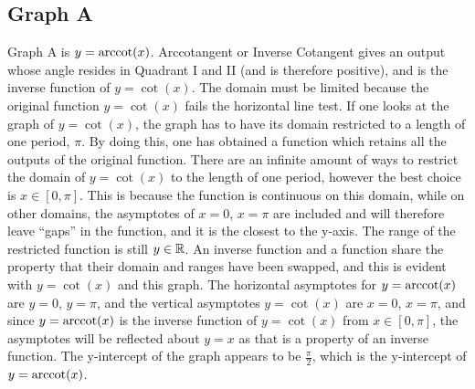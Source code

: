 \subsection{Graph A}

Graph A is $y=\operatorname{arccot}(x)$.
Arccotangent or Inverse Cotangent gives an output whose angle resides in Quadrant I and II (and is therefore positive), and is the inverse function of $y=\cot(x)$.
The domain must be limited because the original function $y=\cot(x)$ fails the horizontal line test.
If one looks at the graph of $y=\cot(x)$, the graph has to have its domain restricted to a length of one period, $\pi$.
By doing this, one has obtained a function which retains all the outputs of the original function.
There are an infinite amount of ways to restrict the domain of $y=\cot(x)$ to the length of one period, however the best choice is $x \in {[0,\pi]}$.
This is because the function is continuous on this domain, while on other domains, the asymptotes of $x=0$, $x=\pi$ are included and will therefore leave “gaps” in the function, and it is the closest to the y-axis.
The range of the restricted function is still $y \in \mathbb{R}$.
An inverse function and a function share the property that their domain and ranges have been swapped, and this is evident with $y=\cot(x)$ and this graph.
The horizontal asymptotes for $y=\operatorname{arccot}(x)$ are $y=0$, $y=\pi$, and the vertical asymptotes $y=\cot(x)$ are $x=0$, $x=\pi$, and since $y=\operatorname{arccot}(x)$ is the inverse function of $y=\cot(x)$ from $x \in {[0,\pi]}$, the asymptotes will be reflected about $y=x$ as that is a property of an inverse function.
The y-intercept of the graph appears to be $\frac{\pi}{2}$, which is the y-intercept of $y=\operatorname{arccot}(x)$.
